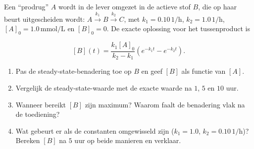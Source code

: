 \begin{oefening}
Een ``prodrug'' \(A\) wordt in de lever omgezet in de actieve stof \(B\), die op haar beurt uitgescheiden wordt: \(A \xrightarrow{k_1} B \xrightarrow{k_2} C\), met \(k_1 = 0.10\,\mathrm{1/h}\), \(k_2 = 1.0\,\mathrm{1/h}\), \([A]_0 = 1.0\,\mathrm{mmol/L}\) en \([B]_0 = 0\). De exacte oplossing voor het tussenproduct is

\[
[B](t) = \frac{k_1[A]_0}{k_2 - k_1}\left(e^{-k_1t} - e^{-k_2t}\right).
\]

\begin{enumerate}
\item[(a)]
  Pas de steady-state-benadering toe op \(B\) en geef \([B]\) als functie van \([A]\).
\item[(b)]
  Vergelijk de steady-state-waarde met de exacte waarde na \(1\), \(5\) en \(10\) uur.
\item[(c)]
  Wanneer bereikt \([B]\) zijn maximum? Waarom faalt de benadering vlak na de toediening?
\item[(d)]
  Wat gebeurt er als de constanten omgewisseld zijn (\(k_1 = 1.0\), \(k_2 = 0.10\,\mathrm{1/h}\))? Bereken \([B]\) na \(5\) uur op beide manieren en verklaar.
\end{enumerate}
\end{oefening}
